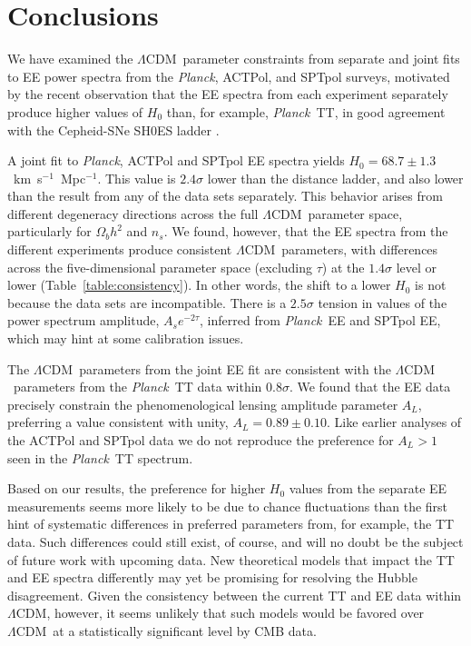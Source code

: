 \documentclass[twocolumn]{aastex63}
\newcommand{\planck}{\textsl{Planck}}
\newcommand{\lcdm}{\ensuremath{\Lambda\mathrm{CDM}}}
\begin{document}
\section{Conclusions}
\label{sec:conclusions}

We have examined the \lcdm\ parameter constraints from separate and joint fits to EE power spectra from the \planck, ACTPol, and SPTpol surveys, motivated by the recent observation that the EE spectra from each experiment separately produce higher values of $H_0$ than, for example, \planck\ TT, in good agreement with the Cepheid-SNe SH0ES ladder \citep{dutcher/etal:prep}.

A joint fit to \planck, ACTPol and SPTpol EE spectra yields $H_0=68.7\pm1.3$~km~s$^{-1}$~Mpc$^{-1}$. This value is $2.4\sigma$ lower than the distance ladder, and also lower than the result from any of the data sets separately. This behavior arises from different degeneracy directions across the full \lcdm\ parameter space, particularly for $\Omega_bh^2$ and $n_s$. We found, however, that the EE spectra from the different experiments produce consistent \lcdm\ parameters, with differences across the five-dimensional parameter space (excluding $\tau$) at the $1.4\sigma$ level or lower (Table~\ref{table:consistency}). In other words, the shift to a lower $H_0$ is not because the data sets are incompatible. There is a $2.5\sigma$ tension in values of the power spectrum amplitude, $A_se^{-2\tau}$, inferred from \planck\ EE and SPTpol EE, which may hint at some calibration issues.

The \lcdm\ parameters from the joint EE fit are consistent with the \lcdm\ parameters from the \planck\ TT data within $0.8\sigma$. We found that the EE data precisely constrain the phenomenological lensing amplitude parameter $A_L$, preferring a value consistent with unity, $A_L=0.89\pm0.10$. Like earlier analyses of the ACTPol and SPTpol data we do not reproduce the preference for $A_L>1$ seen in the \planck\ TT spectrum.

Based on our results, the preference for higher $H_0$ values from the separate EE measurements seems more likely to be due to chance fluctuations than the first hint of systematic differences in preferred parameters from, for example, the TT data. Such differences could still exist, of course, and will no doubt be the subject of future work with upcoming data. New theoretical models that impact the TT and EE spectra differently may yet be promising for resolving the Hubble disagreement. Given the consistency between the current TT and EE data within \lcdm, however, it seems unlikely that such models would be favored over \lcdm\ at a statistically significant level by CMB data.
\end{document}

